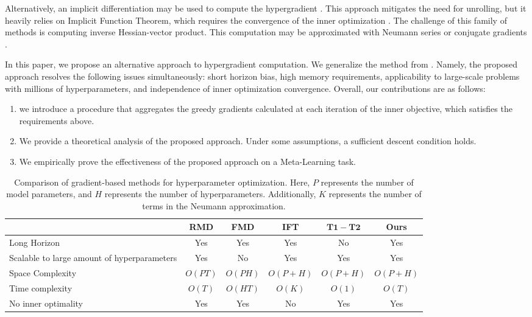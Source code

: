 Alternatively, an implicit differentiation may be used to compute the hypergradient \cite{lorraine2020optimizing, luketina2016scalable, pedregosa2016hyperparameter}. This approach mitigates the need for unrolling, but it heavily relies on Implicit Function Theorem, which requires the convergence of the inner optimization  \cite{grazzi2020iteration, blondel2022efficient}. The challenge of this family of methods is computing inverse Hessian-vector product. This computation may be approximated with Neumann series \cite{lorraine2020optimizing} or conjugate gradients \cite{pedregosa2016hyperparameter}.

In this paper, we propose an alternative approach to hypergradient computation. We generalize the method from \cite{luketina2016scalable}. Namely, the proposed approach resolves the following issues simultaneously: short horizon bias, high memory requirements, applicability to large-scale problems with millions of hyperparameters, and independence of inner optimization convergence. Overall, our contributions are as follows:
\begin{enumerate}
    \item we introduce a procedure that aggregates the greedy gradients  calculated at each iteration of the inner objective, which satisfies the requirements above.
    \item We provide a theoretical analysis of the proposed approach. Under some assumptions, a sufficient descent condition holds.
    \item We empirically prove the effectiveness of the proposed approach on a Meta-Learning task.
\end{enumerate}


\begin{table}[]
    \caption{Comparison of gradient-based methods for hyperparameter optimization. Here, $P$ represents the number of model parameters, and $H$ represents the number of hyperparameters. Additionally, $K$ represents the number of terms in the Neumann approximation.}
    \centering
    \begin{tabular}{p{4cm}|ccccc} \toprule
         & \textbf{RMD} \cite{franceschi2017forward} & \textbf{FMD} \cite{franceschi2017forward} & \textbf{IFT} \cite{lorraine2020optimizing} & $\mathbf{T1-T2}$ \cite{luketina2016scalable} & \textbf{Ours}  \\ \midrule\midrule
        Long Horizon & Yes & Yes & Yes & No & Yes \\ \midrule
        Scalable to large amount of hyperparameters & Yes & No & Yes & Yes & Yes \\ \midrule
        Space Complexity & $O(PT)$ & $O(PH)$ & $O(P+H)$ & $O(P+H)$ & $O(P+H)$ \\ \midrule
        Time complexity & $O(T)$ & $O(HT)$ & $O(K)$ & $O(1)$ & $O(T)$ \\ \midrule
        No inner optimality & Yes & Yes & No & Yes & Yes \\ \bottomrule
    \end{tabular}

    \label{tab:comparison}
\end{table}



